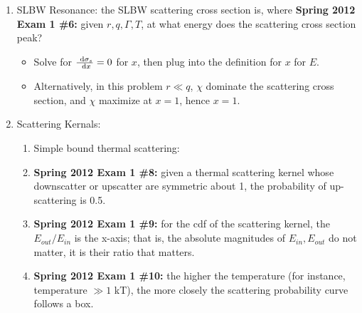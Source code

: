 \documentclass{school-22.211-notes}
\begin{document}
\begin{enumerate}
\begin{enumerate}
    \item SLBW Resonance: the SLBW scattering cross section is, 
      where 
      \textbf{Spring 2012 Exam 1 \#6:} given $r,q, \Gamma,T$, at what energy does the scattering cross section peak? 
      \begin{itemize}
        \item Solve for $\frac{\mbox{ }\mathrm{d} \sigma_s}{\mbox{ }\mathrm{d} x} = 0$ for $x$, then plug into the definition for $x$ for $E$.
        \item Alternatively, in this problem $r \ll q$, $\chi$ dominate the scattering cross section, and $\chi$ maximize at $x=1$, hence $x=1$. 
      \end{itemize}

    \item Scattering Kernals: 
      \begin{enumerate}
      \item Simple bound thermal scattering: 
      \item \textbf{Spring 2012 Exam 1 \#8:} given a thermal scattering kernel whose downscatter or upscatter are symmetric about 1, the probability of up-scattering is 0.5. 
      \item \textbf{Spring 2012 Exam 1 \#9:} for the cdf of the scattering kernel, the $E_{out}/E_{in}$ is the x-axis; that is, the absolute magnitudes of $E_{in}, E_{out}$ do not matter, it is their ratio that matters. 
      \item \textbf{Spring 2012 Exam 1 \#10:} the higher the temperature (for instance, temperature $\gg 1$ kT), the more closely the scattering probability curve follows a box. 
      \end{enumerate}
  \end{enumerate}


\end{enumerate}
\end{document}
